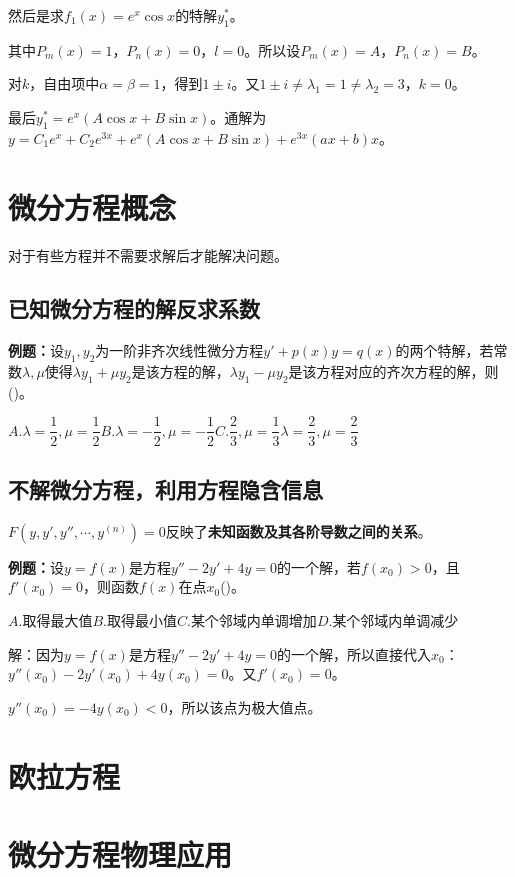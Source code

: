 \documentclass[UTF8, 12pt]{ctexart}
\begin{document}
然后是求$f_1(x)=e^x\cos x$的特解$y_1^*$。

其中$P_m(x)=1$，$P_n(x)=0$，$l=0$。所以设$P_m(x)=A$，$P_n(x)=B$。

对$k$，自由项中$\alpha=\beta=1$，得到$1\pm i$。又$1\pm i\neq\lambda_1=1\neq\lambda_2=3$，$k=0$。

最后$y_1^*=e^x(A\cos x+B\sin x)$。通解为$y=C_1e^x+C_2e^{3x}+e^x(A\cos x+B\sin x)+e^{3x}(ax+b)x$。

\section{微分方程概念}

对于有些方程并不需要求解后才能解决问题。

\subsection{已知微分方程的解反求系数}

\textbf{例题：}设$y_1,y_2$为一阶非齐次线性微分方程$y'+p(x)y=q(x)$的两个特解，若常数$\lambda,\mu$使得$\lambda y_1+\mu y_2$是该方程的解，$\lambda y_1-\mu y_2$是该方程对应的齐次方程的解，则()。

$A.\lambda=\dfrac{1}{2},\mu=\dfrac{1}{2}$\qquad$B.\lambda=-\dfrac{1}{2},\mu=-\dfrac{1}{2}$\qquad$C.\dfrac{2}{3},\mu=\dfrac{1}{3}$\qquad$\lambda=\dfrac{2}{3},\mu=\dfrac{2}{3}$

\subsection{不解微分方程，利用方程隐含信息}

$F(y,y',y'',\cdots,y^{(n)})=0$反映了\textbf{未知函数及其各阶导数之间的关系}。

\textbf{例题：}设$y=f(x)$是方程$y''-2y'+4y=0$的一个解，若$f(x_0)>0$，且$f'(x_0)=0$，则函数$f(x)$在点$x_0$()。

$A.$取得最大值\qquad$B.$取得最小值\qquad$C.$某个邻域内单调增加\qquad$D.$某个邻域内单调减少

解：因为$y=f(x)$是方程$y''-2y'+4y=0$的一个解，所以直接代入$x_0$：$y''(x_0)-2y'(x_0)+4y(x_0)=0$。又$f'(x_0)=0$。

$y''(x_0)=-4y(x_0)<0$，所以该点为极大值点。

\section{欧拉方程}

\section{微分方程物理应用}
\end{document}
